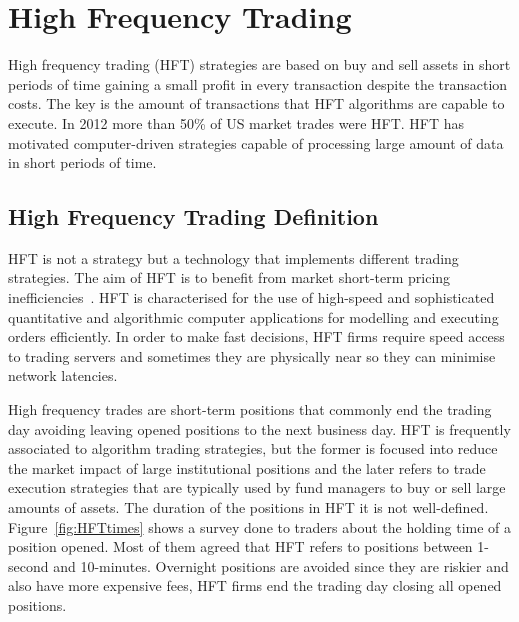 \chapter{High Frequency Trading}

\vspace{0.5cm} 

High frequency trading (HFT) strategies are based on buy and sell assets in
short periods of time gaining a small profit in every transaction despite the
transaction costs. The key is the amount of transactions that HFT algorithms are
capable to execute.  In 2012 more than 50\% of US market trades were HFT.  HFT
has motivated computer-driven strategies capable of processing large amount of
data in short periods of time. 


\section{High Frequency Trading Definition}

HFT is not a strategy but a technology that implements different trading
strategies. The aim of HFT is to benefit from market short-term pricing
inefficiencies~\cite{chlistalla2011}. HFT is characterised for the use of
high-speed and sophisticated quantitative and algorithmic computer applications
for modelling and executing orders efficiently. In order to make fast decisions,
HFT firms require speed access to trading servers and sometimes they are
physically near so they can minimise network latencies.

High frequency trades are short-term positions that commonly end the trading day
avoiding leaving opened positions to the next business day. HFT is frequently
associated to algorithm trading strategies, but the former is focused into
reduce the market impact of large institutional positions and the later refers
to trade execution strategies that are typically used by fund managers to buy or
sell large amounts of assets. The duration of the positions in HFT it is not
well-defined. Figure~\ref{fig:HFTtimes} shows a survey done to traders about the
holding time of a position opened. Most of them agreed that HFT refers to
positions between 1-second and 10-minutes. Overnight positions are avoided since
they are riskier and also have more expensive fees, HFT firms end the trading
day closing all opened positions.

